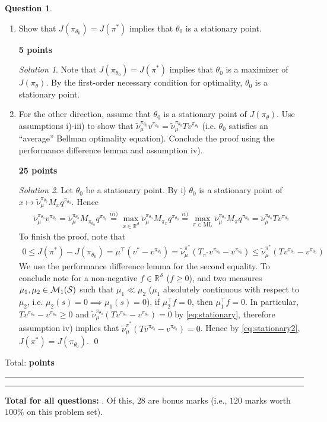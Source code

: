 \documentclass{article}
\newcommand{\R}{\mathbb{R}}
\DeclareMathOperator*{\1}{\mathbbm{1}}
\newcounter{DocPoints} %
\newcounter{QuestionPoints} %
\newcommand{\points}[1]{%
	\par\mbox{}\par\noindent\hfill {\bf #1 points}%
	\addtocounter{DocPoints}{#1}
	\addtocounter{QuestionPoints}{#1}
}
\newcommand{\tpoints}[1]{        %
	\ifthenelse{\isempty{#1}}%
	{%
	}%
	{%
		\addtocounter{DocPoints}{#1}
		\addtocounter{QuestionPoints}{#1}
	}													 %
	\par\mbox{}\par\noindent\hfill {Total: \bf \arabic{QuestionPoints}\xspace points}\par\mbox{}\par\hrule\hrule
	\setcounter{QuestionPoints}{0}
}
\theoremstyle{definition}
\newtheorem{question}{Question}
\theoremstyle{remark}
\newtheorem*{solution*}{Solution}
\newcommand{\cS}{\mathcal{S}}
\begin{document}
\begin{question}
\begin{enumerate}	
	\item  Show that $J(\pi_{\theta_0}) = J(\pi^*)$ implies that $\theta_0$ is a stationary point.
	\points{5}


\begin{solution*}
	Note that $J(\pi_{\theta_0}) = J(\pi^*)$ implies that $\theta_0$ is a maximizer of $J(\pi_\theta)$. By the first-order necessary condition for optimality, $\theta_0$ is a stationary point.
\end{solution*}

\item For the other direction, assume that $\theta_0$ is a stationary point of $J(\pi_\theta)$. Use assumptions i)-iii) to show that $\tilde \nu_\mu^{\pi_{\theta_0}} v^{\pi_{\theta_0}} = \tilde \nu_\mu^{\pi_{\theta_0}} T v^{\pi_{\theta_0}}$ (i.e. $\theta_0$ satisfies an ``average'' Bellman optimality equation). 
	Conclude the proof using the performance difference lemma and assumption iv). %

\points{25}

\begin{solution*}
	Let $\theta_0$ be a stationary point. By i) $\theta_0$ is a stationary point of $x \mapsto \tilde \nu_\mu^{\pi_{\theta_0}} M_x q^{\pi_{\theta_0}}$. Hence
	\begin{align}
			\tilde\nu_\mu^{\pi_{\theta_0}} v^{\pi_{\theta_0}} = 	\tilde\nu_\mu^{\pi_{\theta_0}} M_{\pi_{\theta_0}} q^{\pi_{\theta_0}} \stackrel{iii)}{=} \max_{x \in \R^d} \tilde\nu_\mu^{\pi_{\theta_0}} M_{\pi_x} q^{\pi_{\theta_0}} \stackrel{ii)}{=} \max_{\pi \in \text{ML}} \tilde\nu_\mu^{\pi_{\theta_0}} M_\pi q^{\pi_{\theta_0}} = 	\tilde\nu_\mu^{\pi_{\theta_0}} T v^{\pi_{\theta_0}}\label{eq:stationary}
	\end{align}
	To finish the proof, note that
	\begin{align}
		0 \leq J(\pi^*) - J(\pi_{\theta_0}) = \mu^\top (v^{*} - v^{\pi_{\theta_0}}) = \tilde\nu_\mu^{\pi^*}(T_{\pi^*} v^{\pi_{\theta_0}} - v^{\pi_{\theta_0}}) \leq \tilde \nu_\mu^{\pi^*}(T v^{\pi_{\theta_0}} - v^{\pi_{\theta_0}})\label{eq:stationary2}
	\end{align}
	We use the performance difference lemma for the second equality. To conclude note for a non-negative $f \in \R^\cS$ ($f \geq 0$), and two measures $\mu_1, \mu_2 \in \cM_1(\cS)$ such that $\mu_1 \ll \mu_2$ ($\mu_1$ absolutely continuous with respect to $\mu_2$, i.e. $\mu_2(s) = 0 \implies \mu_1(s)=0$), if $\mu_2^\top f = 0$, then $\mu_1^\top f = 0$. In particular, $T v^{\pi_{\theta_0}} - v^{\pi_{\theta_0}} \geq 0$ and $\tilde \nu_\mu^{\pi_{\theta_0}}(T v^{\pi_{\theta_0}} - v^{\pi_{\theta_0}}) = 0$  by  \eqref{eq:stationary}, therefore assumption iv) implies that $\tilde \nu_\mu^{\pi^*}(T v^{\pi_{\theta_0}} - v^{\pi_{\theta_0}}) = 0$. Hence by \cref{eq:stationary2}, $J(\pi^*) = J(\pi_{\theta_0})$. \qed
\end{solution*}
\end{enumerate}
\tpoints{}
\end{question}


\bigskip
\bigskip

\noindent
\textbf{
	\noindent
	Total for all questions: }.
Of this, $28$ are bonus marks (i.e., $120$ marks worth $100\%$ on this problem set).
\end{document}
